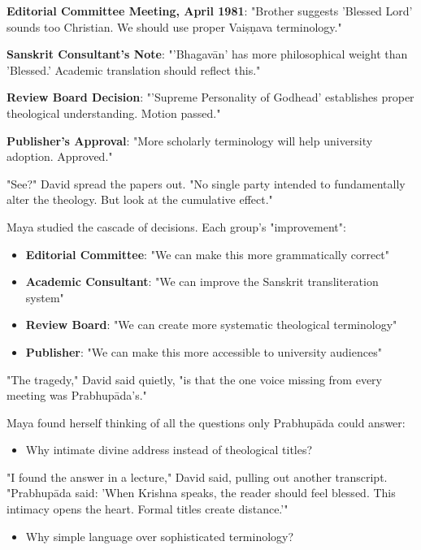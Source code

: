 \documentclass[12pt,twoside]{book}
\begin{document}
\textbf{\textbf{Editorial Committee Meeting, April 1981}}: "Brother suggests 'Blessed Lord' sounds too Christian. We should use proper Vaiṣṇava terminology."

\textbf{\textbf{Sanskrit Consultant's Note}}: "'Bhagavān' has more philosophical weight than 'Blessed.' Academic translation should reflect this."

\textbf{\textbf{Review Board Decision}}: "'Supreme Personality of Godhead' establishes proper theological understanding. Motion passed."

\textbf{\textbf{Publisher's Approval}}: "More scholarly terminology will help university adoption. Approved."

"See?" David spread the papers out. "No single party intended to fundamentally alter the theology. But look at the cumulative effect."

Maya studied the cascade of decisions. Each group's "improvement":
\begin{itemize}
\item \textbf{\textbf{Editorial Committee}}: "We can make this more grammatically correct"
\item \textbf{\textbf{Academic Consultant}}: "We can improve the Sanskrit transliteration system"
\item \textbf{\textbf{Review Board}}: "We can create more systematic theological terminology"
\item \textbf{\textbf{Publisher}}: "We can make this more accessible to university audiences"
\end{itemize}

"The tragedy," David said quietly, "is that the one voice missing from every meeting was Prabhupāda's."

Maya found herself thinking of all the questions only Prabhupāda could answer:

\begin{itemize}
\item Why intimate divine address instead of theological titles?
\end{itemize}

"I found the answer in a lecture," David said, pulling out another transcript. "Prabhupāda said: 'When Krishna speaks, the reader should feel blessed. This intimacy opens the heart. Formal titles create distance.'"

\begin{itemize}
\item Why simple language over sophisticated terminology?
\end{itemize}
\end{document}
